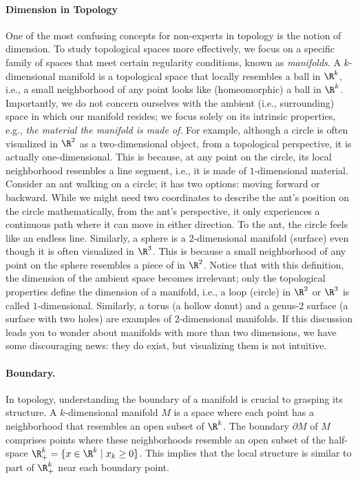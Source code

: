 \paragraph*{Dimension in Topology} One of the most confusing concepts for non-experts in topology is the notion of dimension. To study topological spaces more effectively, we focus on a specific family of spaces that meet certain regularity conditions, known as \textit{manifolds}. A $k$-dimensional manifold is a topological space that locally resembles a ball in $\R^k$, i.e., a small neighborhood of any point looks like (homeomorphic) a ball in $\R^k$. 
Importantly, we do not concern ourselves with the ambient (i.e., surrounding) space in which our manifold resides; we focus solely on its intrinsic properties, e.g., \textit{the material the manifold is made of}. For example, although a circle is often visualized in $\R^2$ as a two-dimensional object, from a topological perspective, it is actually one-dimensional. This is because, at any point on the circle, its local neighborhood resembles a line segment, i.e., it is made of $1$-dimensional material. Consider an ant walking on a circle; it has two options: moving forward or backward. While we might need two coordinates to describe the ant's position on the circle mathematically, from the ant's perspective, it only experiences a continuous path where it can move in either direction. To the ant, the circle feels like an endless line. Similarly, a sphere is a $2$-dimensional manifold (surface) even though it is often visualized in $\R^3$. This is because a small neighborhood of any point on the sphere resembles a piece of in $\R^2$. Notice that with this definition, the dimension of the ambient space becomes irrelevant; only the topological properties define the dimension of a manifold, i.e., a loop (circle) in $\R^2$  or $\R^3$ is called $1$-dimensional.  Similarly, a torus (a hollow donut) and a genus-2 surface (a surface with two holes) are examples of 2-dimensional manifolds. If this discussion leads you to wonder about manifolds with more than two dimensions, we have some discouraging news: they do exist, but visualizing them is not intuitive.



\paragraph*{Boundary.} In topology, understanding the boundary of a manifold is crucial to grasping its structure. A $k$-dimensional manifold $M$ is a space where each point has a neighborhood that resembles an open subset of $\R^k$. The boundary $\partial M$ of $M$ comprises points where these neighborhoods resemble an open subset of the half-space $\R^k_+ = \{ x \in \R^k \mid x_k \geq 0 \}$. This implies that the local structure is similar to part of $\R^k_+$ near each boundary point.

